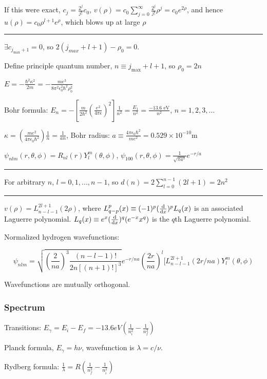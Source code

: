 If this were exact, $c_j = \frac{2^j}{j!} c_0$, $v(\rho) = c_0 \sum_{j=0}^{\infty} \frac{2^j}{j!} \rho^j = c_0 e^{2\rho}$, and hence $u(\rho) = c_0 \rho^{l+1} e^{\rho}$, which blows up at large $\rho$

\hrule height 0.1pt

$\exists c_{j_{\textrm{max}} + 1} = 0$, so $2(j_{max} + l + 1) - \rho_0 = 0$.

Define principle quantum number, $n \equiv j_{\textrm{max}} + l + 1$, so $\rho_0 = 2n$

$E = -\frac{\hbar^2 \kappa^2}{2m} = - \frac{me^3}{8 \pi^2 \epsilon_0^2 \hbar^2 \rho_0^2}$

Bohr formula: $E_n = - [\frac{m}{2 \hbar^2} (\frac{e^2}{4\pi\epsilon})^2] \frac{1}{n^2} = \frac{E_1}{n^2} = \frac{-13.6 \textrm{ eV}}{n^2}$, $n=1, 2, 3, ...$

$\kappa = (\frac{me^2}{4 \pi \epsilon_0 \hbar^2}) \frac{1}{n} = \frac{1}{an}$, Bohr radius: $a \equiv \frac{4 \pi \epsilon_0 \hbar^2}{me^2} = 0.529 \times 10^{-10} \textrm{m}$

$\psi_{nlm}(r, \theta, \phi) = R_{nl}(r) Y_l^m(\theta, \phi)$, 
$\psi_{100}(r, \theta, \phi) = \frac{1}{\sqrt{\pi a^3}} e^{-r/a}$

\hrule height 0.1pt

For arbitrary $n$, $l = 0, 1, ..., n-1$, so $d(n) = 2 \sum_{l=0}^{n-1} (2l+1) = 2 n^2$

\hrule height 0.07pt

$v(\rho) = L_{n-l-1}^{2l+1} (2 \rho)$, where $L_{q-p}^p(x) \equiv (-1)^p (\dv{}{x})^p L_q (x)$ is an associated Laguerre polynomial. $L_q(x) \equiv e^x (\dv{}{x})^q (e^{-x} x^q)$ is the $q$th Laguerre polynomial.

Normalized hydrogen wavefunctions:

$$\psi_{nlm} = \sqrt{(\frac{2}{na})^3 \frac{(n-l-1)!}{2n[(n+1)!]^3}} e^{-r/na} (\frac{2r}{na})^l [L_{n-l-1}^{2l+1} (2r/na) Y_l^m (\theta, \phi)$$

Wavefunctions are mutually orthogonal.

\subsubsection{Spectrum}

Transitions: $E_{\gamma} = E_i - E_f = -13.6 eV(\frac{1}{n_i^2} - \frac{1}{n_f^2})$

Planck formula, $E_{\gamma} = h \nu$, wavefunction is $\lambda = c / \nu$. 

Rydberg formula: $\frac{1}{\lambda} = R(\frac{1}{n^2_f} - \frac{1}{n^2_i})$

